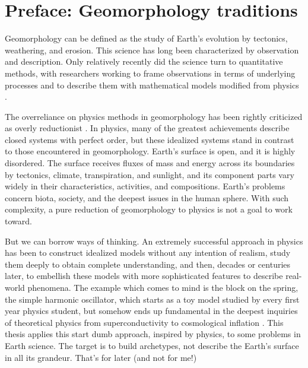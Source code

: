 
\chapter{Preface: Geomorphology traditions}
Geomorphology can be defined as the study of Earth's evolution by tectonics, weathering, and erosion. 
This science has long been characterized by observation and description. Only relatively recently did the science turn to quantitative methods, with researchers working to frame observations in terms of underlying processes and to describe them with mathematical models modified from physics \citep{Church2005}.

The overreliance on physics methods in geomorphology has been rightly criticized as overly reductionist \citep{Slaymaker2020}.
In physics, many of the greatest achievements describe closed systems with perfect order, but these idealized systems stand in contrast to those encountered in geomorphology.
Earth's surface is open, and it is highly disordered.
The surface receives fluxes of mass and energy across its boundaries by tectonics, climate, transpiration, and sunlight, and its component parts vary widely in their characteristics, activities, and compositions.
Earth's problems concern biota, society, and the deepest issues in the human sphere.
With such complexity, a pure reduction of geomorphology to physics is not a goal to work toward.

But we can borrow ways of thinking.
An extremely successful approach in physics has been to construct idealized models without any intention of realism, study them deeply to obtain complete understanding, and then, decades or centuries later, to embellish these models with more sophisticated features to describe real-world phenomena.
The example which comes to mind is the block on the spring, the simple harmonic oscillator, which starts as a toy model studied by every first year physics student, but somehow ends up fundamental in the deepest inquiries of theoretical physics from superconductivity to cosmological inflation \citep{Fetter2003,Liddle2000}.
This thesis applies this start dumb approach, inspired by physics, to some problems in Earth science.
The target is to build archetypes, not describe the Earth's surface in all its grandeur. 
That's for later (and not for me!)

